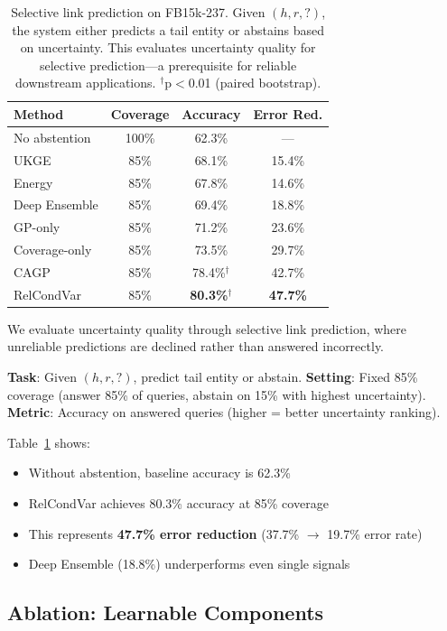 \begin{table}[t]
\centering
\caption{Selective link prediction on FB15k-237. Given $(h, r, ?)$, the system either predicts a tail entity or abstains based on uncertainty. This evaluates uncertainty quality for selective prediction---a prerequisite for reliable downstream applications. $^\dagger$p$<$0.01 (paired bootstrap).}
\label{tab:qa}
\vspace{0.5em}
\small
\begin{tabular}{lccc}
\toprule
Method & Coverage & Accuracy & Error Red. \\
\midrule
No abstention & 100\% & 62.3\% & --- \\
\midrule
UKGE & 85\% & 68.1\% & 15.4\% \\
Energy & 85\% & 67.8\% & 14.6\% \\
Deep Ensemble & 85\% & 69.4\% & 18.8\% \\
GP-only & 85\% & 71.2\% & 23.6\% \\
Coverage-only & 85\% & 73.5\% & 29.7\% \\
\midrule
CAGP & 85\% & 78.4\%$^\dagger$ & 42.7\% \\
RelCondVar & 85\% & \textbf{80.3\%}$^\dagger$ & \textbf{47.7\%} \\
\bottomrule
\end{tabular}
\end{table}

We evaluate uncertainty quality through selective link prediction, where unreliable predictions are declined rather than answered incorrectly.

\textbf{Task}: Given $(h, r, ?)$, predict tail entity or abstain.
\textbf{Setting}: Fixed 85\% coverage (answer 85\% of queries, abstain on 15\% with highest uncertainty).
\textbf{Metric}: Accuracy on answered queries (higher = better uncertainty ranking).

Table~\ref{tab:qa} shows:
\begin{itemize}
    \item Without abstention, baseline accuracy is 62.3\%
    \item RelCondVar achieves 80.3\% accuracy at 85\% coverage
    \item This represents \textbf{47.7\% error reduction} (37.7\% $\to$ 19.7\% error rate)
    \item Deep Ensemble (18.8\%) underperforms even single signals
\end{itemize}

\subsection{Ablation: Learnable Components}

